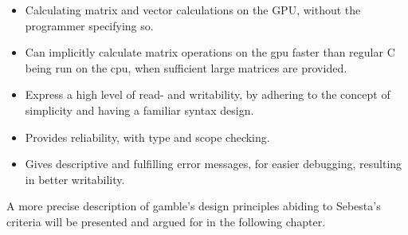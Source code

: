 \begin{itemize}
	\item Calculating matrix and vector calculations on the GPU, without the programmer  specifying so.
	\item Can implicitly calculate matrix operations on the \acrshort{gpu} faster than regular C being run on the \acrshort{cpu}, when sufficient large matrices are provided.
	\item Express a high level of read- and writability, by adhering to the concept of simplicity and having a familiar syntax design.
	\item Provides reliability, with type and scope checking.
	\item Gives descriptive and fulfilling error messages, for easier debugging, resulting in better writability.
\end{itemize}

A more precise description of \gls{gamble}'s design principles abiding to Sebesta's criteria will be presented and argued for in the following chapter.
